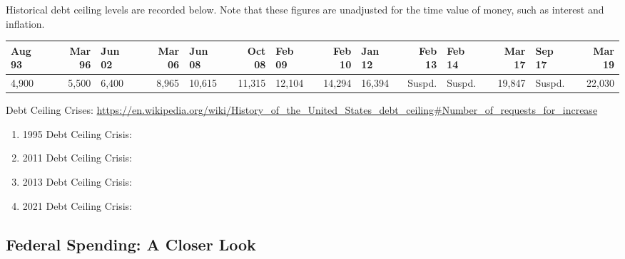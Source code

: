 \documentclass{article}
\begin{document}
    Historical debt ceiling levels are recorded below. Note that these figures are unadjusted for the time value of money, such as interest and inflation.

    \begin{table}[H]
      \begin{tabular}{lrlrlrlrlrlrlr}
      \hline
      Aug 93 & Mar 96 & Jun 02 & Mar 06 & Jun 08 & Oct 08 & Feb 09 & Feb 10 & Jan 12 & Feb 13 & Feb 14 & Mar 17 & Sep 17 & Mar 19 \\
      \hline
      4,900 & 5,500 & 6,400 & 8,965 & 10,615 & 11,315 & 12,104 & 14,294 & 16,394 & Suspd. & Suspd. & 19,847 & Suspd. & 22,030 \\
      \hline
      \end{tabular}
    \end{table}

    Debt Ceiling Crises: \url{https://en.wikipedia.org/wiki/History_of_the_United_States_debt_ceiling#Number_of_requests_for_increase}

    \begin{enumerate}
      \item 1995 Debt Ceiling Crisis:
      \item 2011 Debt Ceiling Crisis:
      \item 2013 Debt Ceiling Crisis:
      \item 2021 Debt Ceiling Crisis:
    \end{enumerate}

  \subsection{Federal Spending: A Closer Look}
\end{document}
